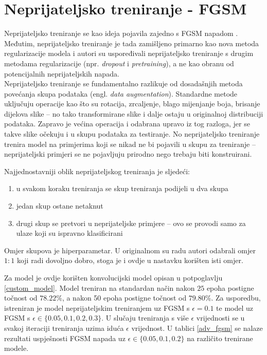 \documentclass[utf8, diplomski]{fer}
\begin{document}
\section{Neprijateljsko treniranje - FGSM}
Neprijateljsko treniranje se kao ideja pojavila zajedno s FGSM napadom \citep{Goodfellow2015ExplainingAH}. Međutim, neprijateljsko treniranje je tada zamišljeno primarno kao nova metoda regularizacije modela i autori su uspoređivali neprijateljsko treniranje s drugim metodama regularizacije (npr. \textit{dropout} i \textit{pretraining}), a ne kao obranu od potencijalnih neprijateljskih napada. \\
Neprijateljsko treniranje se fundamentalno razlikuje od dosadašnjih metoda povećanja skupa podataka (engl. \textit{data augmentation}). Standardne metode uključuju operacije kao što su rotacija, zrcaljenje, blago mijenjanje boja, brisanje dijelova slike -- no tako transformirane slike i dalje ostaju u originalnoj distribuciji podataka. Zapravo je većina operacija i odabrana upravo iz tog razloga, jer se takve slike očekuju i u skupu podataka za testiranje. No neprijateljsko treniranje trenira model na primjerima koji se nikad ne bi pojavili u skupu za treniranje -- neprijateljski primjeri se ne pojavljuju prirodno nego trebaju biti konstruirani. \par
Najjednostavniji oblik neprijateljskog treniranja je sljedeći:
\begin{enumerate}[noitemsep, label=\textbullet]
  \item u svakom koraku treniranja se skup treniranja podijeli u dva skupa
  \item jedan skup ostane netaknut
  \item drugi skup se pretvori u neprijateljske primjere -- ovo se provodi samo za ulaze koji su ispravno klasificirani
\end{enumerate} 
Omjer skupova je hiperparametar. U originalnom su radu autori odabrali omjer $1:1$ koji radi dovoljno dobro, stoga je i ovdje u nastavku korišten isti omjer.
\par
Za model je ovdje korišten konvolucijski model opisan u potpoglavlju \ref{custom_model}. Model treniran na standardan način nakon $25$ epoha postigne točnost od $78.22\%$, a nakon 50 epoha postigne točnost od $79.80\%$. Za usporedbu, istreniran je model neprijateljskim treniranjem uz FGSM s $\epsilon = 0.1$ te model uz FGSM s $\epsilon \in \{0.05, 0.1, 0.2, 0.3\}$. U slučaju treniranja s više $\epsilon$ vrijednosti se u svakoj iteraciji treniranja uzima iduća $\epsilon$ vrijednost. U tablici \ref{adv_fgsm} se nalaze rezultati uspješnosti FGSM napada uz $\epsilon \in \{0.05, 0.1, 0.2\}$ na različito trenirane modele.
\end{document}
